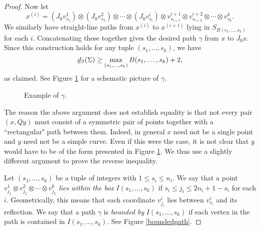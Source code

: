 \documentclass[11 pt]{amsart}
\theoremstyle{remark}
\newcommand{\bunderline}[1]{\underline{#1\mkern-2mu}\mkern2mu }
\def\dl {\bunderline{d}}
\def\Inv{\mathfrak{I}}
\begin{document}
\begin{proof}
Now let
\[
x^{(i)} = (J_0v^1_{s_1}) \otimes (J_0v^2_{s_2}) \otimes \cdots \otimes (J_0v^i_{s_i}) \otimes v^{i+1}_{s_{i+1}} \otimes v^{i+2}_{s_{i+2}} \otimes \cdots \otimes v^k_{s_k}.
\]
We similarly have straight-line paths from $x^{(i)}$ to $x^{(i+1)}$ lying in $S_{B(s_1, \ldots, s_k)}$ for each $i$. Concatenating these together gives the desired path $\gamma$ from $x$ to $J_0x$. Since this construction holds for any tuple $(s_1, \ldots, s_k)$, we have
\[
\dl_{\Inv}(\Sigma) \geq \max_{(s_1, \ldots, s_k)} B(s_1, \ldots, s_k) + 2,
\]
as claimed. See Figure \ref{rectpath} for a schematic picture of $\gamma$. 

\begin{figure}[h!]
\caption{Example of $\gamma$.}
\label{rectpath}
\end{figure}
\noindent
The reason the above argument does not establish equality is that not every pair $(x, Qy)$ must consist of a symmetric pair of points together with a ``rectangular" path between them. Indeed, in general $x$ need not be a single point and $y$ need not be a simple curve. Even if this were the case, it is not clear that $y$ would have to be of the form presented in Figure \ref{rectpath}. We thus use a slightly different argument to prove the reverse inequality. 

Let  $(s_1, \ldots, s_k)$ be a tuple of integers with $1 \leq s_i \leq n_i$. We say that a point $v^1_{j_1} \otimes v^2_{j_2} \otimes \cdots \otimes v^k_{j_k}$ \textit{lies within the box} $I(s_1, \ldots, s_k)$ if $s_i \leq j_i \leq 2n_i + 1- s_i$ for each $i$. Geometrically, this means that each coordinate $v^i_{j_i}$ lies between $v^i_{s_i}$ and its reflection. We say that a path $\gamma$ is \textit{bounded by} $I(s_1, \ldots, s_k)$ if each vertex in the path is contained in $I(s_1, \ldots, s_k)$. See Figure \ref{boundedpath}. 


\end{proof}
\end{document}
